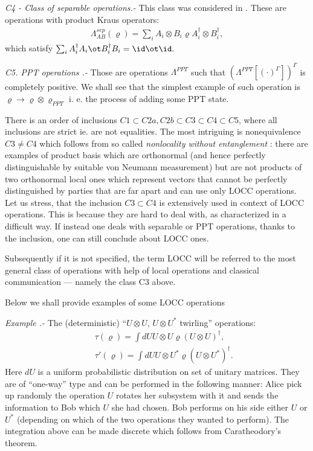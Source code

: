 \documentclass[rmp,12pt,preprint]{revtex4-2}
\begin{document}
{\it C4 - Class of separable operations.-} This class was considered
in \cite{PlenioVedral1998,RainsSep}. These are operations with product
Kraus operators:
\begin{eqnarray}
\Lambda^{sep}_{AB}(\varrho)=\sum_{i} A_{i} \otimes B_{i} \varrho
A_{i}^{\dagger} \otimes B_{i}^{\dagger}, \label{Separable}
\end{eqnarray}
which satisfy $\sum_i A_{i}^{\dagger} A_{i}\ot B_{i}^{\dagger} B_{i} = \id\ot\id.$

{\it C5. PPT operations .-} Those are operations
\cite{Rains1999,Rains-erratum1999} $\Lambda^{PPT}$ such that $
(\Lambda^{PPT}[(\cdot)^{\Gamma}])^{\Gamma}$ is completely positive. We
shall see that the simplest example of such operation is $\varrho
\rightarrow \varrho \otimes \varrho_{PPT}$ i. e. the process of adding
some PPT state.

There is an order of inclusions $C1 \subset C2a,C2b \subset C3 \subset
C4 \subset C5$, where all inclusions are strict ie. are not
equalities. The most intriguing is nonequivalence $C3 \neq C4$ which
follows from so called {\it nonlocality without entanglement}
\cite{Bennett-nlwe}: there are examples of product basis which are
orthonormal (and hence perfectly distinguishable by suitable von
Neumann measurement) but are not products of two orthonormal local
ones which represent vectors that cannot be perfectly distinguished by
parties that are far apart and can use only LOCC operations. Let us
stress, that the inclusion $C3 \subset C4$ is extensively used in
context of LOCC operations. This is because they are hard to deal
with, as characterized in a difficult way. If instead one deals with
separable or PPT operations, thanks to the inclusion, one can still
conclude about LOCC ones.

Subsequently if it is not specified, the term LOCC will be referred to
the most general class of operations with help of local operations and
classical communication --- namely the class C3 above.

Below we shall provide examples of some LOCC operations

{\it Example .-} The (deterministic) ``$U \otimes U$, $U \otimes
U^{*}$ twirling'' operations:
\begin{eqnarray}
&&\tau(\varrho) =\int dU U \otimes U \varrho (U \otimes U)^{\dagger}, \nonumber \\
&&\tau'(\varrho) =\int dU U \otimes U^{*} \varrho (U \otimes
U^{*})^{\dagger}.
\end{eqnarray}
Here $dU$ is a uniform probabilistic distribution on set of unitary
matrices. They are of ``one-way'' type and can be performed in the
following manner: Alice pick up randomly the operation $U$ rotates her
subsystem with it and sends the information to Bob which $U$ she had
chosen. Bob performs on his side either $U$ or $U^{*}$ (depending on
which of the two operations they wanted to perform).  The integration
above can be made discrete which follows from Caratheodory's theorem.
\end{document}

